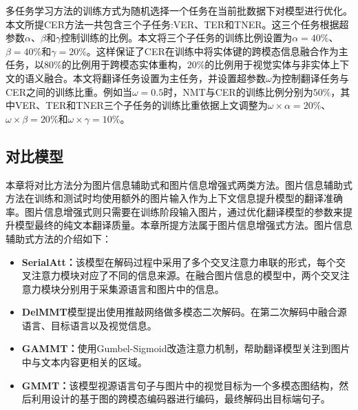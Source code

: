 多任务学习方法的训练方式为随机选择一个任务在当前批数据下对模型进行优化。本文所提CER方法一共包含三个子任务:VER、TER和TNER。这三个任务根据超参数$\alpha$、$\beta$和$\gamma$控制训练的比例。本文将三个子任务的训练比例设置为$\alpha=40\%$、$\beta=40\%$和$\gamma=20\%$。这样保证了CER在训练中将实体键的跨模态信息融合作为主任务，以$80\%$的比例用于跨模态实体重构，$20\%$的比例用于视觉实体与非实体上下文的语义融合。本文将翻译任务设置为主任务，并设置超参数$\omega$为控制翻译任务与CER之间的训练比重。例如当$\omega=0.5$时，NMT与CER的训练比例分别为$50\%$，其中VER、TER和TNER三个子任务的训练比重依据上文调整为$\omega\times\alpha=20\%$、$\omega\times\beta=20\%$和$\omega\times\gamma=10\%$。



\subsection{对比模型}
\label{sec:4_comparison}

本章将对比方法分为图片信息辅助式和图片信息增强式两类方法。图片信息辅助式方法在训练和测试时均使用额外的图片输入作为上下文信息提升模型的翻译准确率。图片信息增强式则只需要在训练阶段输入图片，通过优化翻译模型的参数来提升模型最终的纯文本翻译质量。本章所提方法属于图片信息增强式方法。图片信息辅助式方法的介绍如下：

\begin{itemize}

\item \textbf{SerialAtt\cite{47_DBLP:conf/wmt/LibovickyHM18}：}该模型在解码过程中采用了多个交叉注意力串联的形式，每个交叉注意力模块对应了不同的信息来源。在融合图片信息的模型中，两个交叉注意力模块分别用于采集源语言和图片中的信息。

\item \textbf{DelMMT\cite{39_ive-etal-2019-distilling}}模型提出使用推敲网络做多模态二次解码。在第二次解码中融合源语言、目标语言以及视觉信息。

\item \textbf{GAMMT\cite{41_DBLP:journals/corr/abs-2103-08862}：}使用Gumbel-Sigmoid改造注意力机制，帮助翻译模型关注到图片中与文本内容更相关的区域。

\item \textbf{GMMT\cite{33_yin-etal-2020-novel}：}该模型视源语言句子与图片中的视觉目标为一个多模态图结构，然后利用设计的基于图的跨模态编码器进行编码，最终解码出目标端句子。
\end{itemize}

